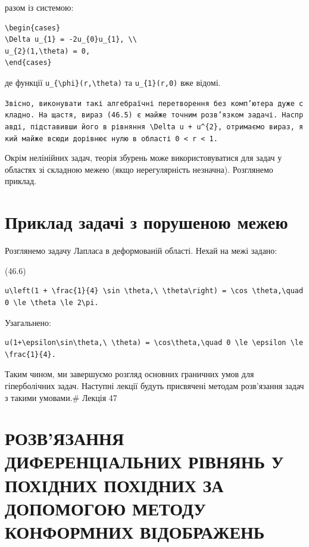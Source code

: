 \documentclass[
  ukrainian,
]{article}
\begin{document}
разом із системою:

\begin{verbatim}
\begin{cases}
\Delta u_{1} = -2u_{0}u_{1}, \\
u_{2}(1,\theta) = 0,
\end{cases}
\end{verbatim}

де функції \texttt{u\_\{\textbackslash{}phi\}(r,\textbackslash{}theta)}
та \texttt{u\_\{1\}(r,0)} вже відомі.

\texttt{Звісно,\ виконувати\ такі\ алгебраїчні\ перетворення\ без\ комп’ютера\ дуже\ складно.\ На\ щастя,\ вираз\ (46.5)\ є\ майже\ точним\ розв’язком\ задачі.\ Насправді,\ підставивши\ його\ в\ рівняння\ \textquotesingle{}\textbackslash{}Delta\ u\ +\ u\^{}\{2\}\textquotesingle{},\ отримаємо\ вираз,\ який\ майже\ всюди\ дорівнює\ нулю\ в\ області\ \textquotesingle{}0\ \textless{}\ r\ \textless{}\ 1\textquotesingle{}.}

Окрім нелінійних задач, теорія збурень може використовуватися для задач
у областях зі складною межею (якщо нерегулярність незначна). Розглянемо
приклад.

\section{Приклад задачі з порушеною
межею}\label{ux43fux440ux438ux43aux43bux430ux434-ux437ux430ux434ux430ux447ux456-ux437-ux43fux43eux440ux443ux448ux435ux43dux43eux44e-ux43cux435ux436ux435ux44e}

Розглянемо задачу Лапласа в деформованій області. Нехай на межі задано:

(46.6)

\begin{verbatim}
u\left(1 + \frac{1}{4} \sin \theta,\ \theta\right) = \cos \theta,\quad 0 \le \theta \le 2\pi.
\end{verbatim}

Узагальнено:

\begin{verbatim}
u(1+\epsilon\sin\theta,\ \theta) = \cos\theta,\quad 0 \le \epsilon \le \frac{1}{4}.
\end{verbatim}

Таким чином, ми завершуємо розгляд основних граничних умов для
гіперболічних задач. Наступні лекції будуть присвячені методам
розв'язання задач з такими умовами.\# Лекція 47

\section{РОЗВ'ЯЗАННЯ ДИФЕРЕНЦІАЛЬНИХ РІВНЯНЬ У ПОХІДНИХ ПОХІДНИХ ЗА
ДОПОМОГОЮ МЕТОДУ КОНФОРМНИХ
ВІДОБРАЖЕНЬ}\label{ux440ux43eux437ux432ux44fux437ux430ux43dux43dux44f-ux434ux438ux444ux435ux440ux435ux43dux446ux456ux430ux43bux44cux43dux438ux445-ux440ux456ux432ux43dux44fux43dux44c-ux443-ux43fux43eux445ux456ux434ux43dux438ux445-ux43fux43eux445ux456ux434ux43dux438ux445-ux437ux430-ux434ux43eux43fux43eux43cux43eux433ux43eux44e-ux43cux435ux442ux43eux434ux443-ux43aux43eux43dux444ux43eux440ux43cux43dux438ux445-ux432ux456ux434ux43eux431ux440ux430ux436ux435ux43dux44c}
\end{document}
